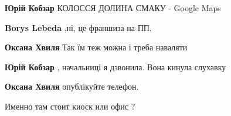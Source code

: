 \begin{itemize}
\begin{itemize}
 
\textbf{Юрій Кобзар} КОЛОССЯ ДОЛИНА СМАКУ - Google Maps

 
\textbf{Borys Lebeda} ,ні, це франшиза на ПП.

 
\textbf{Оксана Хвиля} Так їм теж можна і треба наваляти

 
\textbf{Юрій Кобзар} , начальниці я дзвонила. Вона кинула слухавку

 
\textbf{Оксана Хвиля} опублікуйте телефон.

 

Именно там стоит киоск или офис ?

 

\end{itemize}
\end{itemize}

